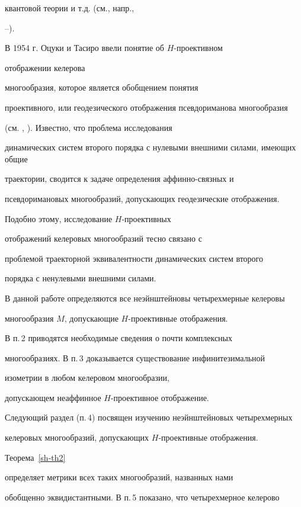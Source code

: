 квантовой теории и т.д. (см., напр.,


\cite{al-free}--\cite{flah}).





В 1954 г. Оцуки и Тасиро \cite{otas} ввели понятие об $H$-проективном


отображении келерова


многообразия, которое является обобщением понятия


проективного, или геодезического отображения псевдориманова многообразия


(см. \cite{am1}, \cite{sin1}). Известно, что проблема исследования


динамических систем второго порядка с нулевыми внешними силами, имеющих общие


траектории, сводится к задаче определения аффинно-связных и


псевдоримановых многообразий, допускающих геодезические отображения.


Подобно этому, исследование $H$-проективных


отображений келеровых многообразий тесно связано с


проблемой траекторной эквивалентности динамических систем второго


порядка с ненулевыми внешними силами.





В данной работе определяются все неэйнштейновы четырехмерные келеровы


многообразия $M$, допускающие $H$-проективные отображения.





В п.\,2 приводятся необходимые сведения о почти комплексных


многообразиях. В п.\,3 доказывается существование инфинитезимальной


изометрии в любом келеровом многообразии,


допускающем неаффинное $H$-проективное отображение.


Следующий раздел (п.\,4) посвящен изучению неэйнштейновых четырехмерных


келеровых многообразий, допускающих $H$-проективные отображения.


Теорема~\ref{sh-th2}


определяет метрики всех таких многообразий, названных нами


обобщенно эквидистантными. В п.\,5 показано, что четырехмерное келерово


